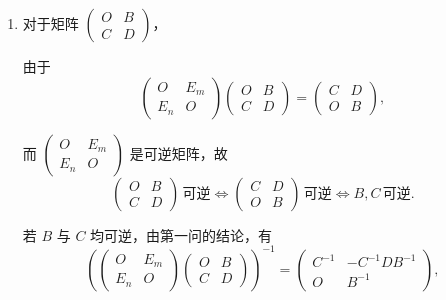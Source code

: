 \documentclass[UTF8,12pt,a4paper,fontset=fandol]{ctexart}
\begin{document}
\begin{solve}
\begin{enumerate}
                \item 对于矩阵 $\begin{pmatrix}
                        O & B \\ C & D
                    \end{pmatrix}$，

                    由于
                    \[
                        \begin{pmatrix}
                            O & E_m \\ E_n & O
                        \end{pmatrix} \begin{pmatrix}
                            O & B \\ C & D
                        \end{pmatrix} = \begin{pmatrix}
                            C & D \\ O & B
                        \end{pmatrix},
                    \]

                    而 $\begin{pmatrix} O & E_m \\ E_n & O \end{pmatrix}$ 是可逆矩阵，故
                    \[
                        \begin{pmatrix}
                            O & B \\ C & D
                        \end{pmatrix} \, \text{可逆}
                        \iff \begin{pmatrix}
                            C & D \\ O & B
                        \end{pmatrix} \, \text{可逆}
                        \iff B, C \, \text{可逆}.
                    \]

                    若 $B$ 与 $C$ 均可逆，由第一问的结论，有
                    \[
                        \left( \begin{pmatrix}
                            O & E_m \\ E_n & O
                        \end{pmatrix} \begin{pmatrix}
                            O & B \\ C & D
                        \end{pmatrix} \right)^{-1} = \begin{pmatrix}
                            C^{-1} & -C^{-1}DB^{-1} \\ O & B^{-1}
                        \end{pmatrix},
                    \]


\end{enumerate}
\end{solve}
\end{document}
